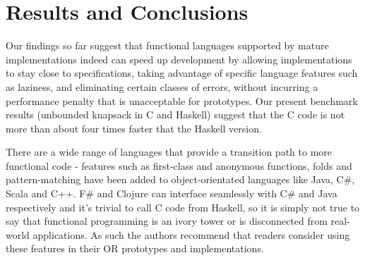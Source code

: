 \section{Results and Conclusions}

Our findings so far suggest that functional languages supported by mature
implementations indeed can speed up development by allowing implementations to
stay close to specifications, taking advantage of specific language features
such as laziness, and eliminating certain classes of errors, without incurring
a performance penalty that is unacceptable for prototypes. Our present
benchmark results (unbounded knapsack in C and Haskell) suggest that the C
code is not more than about four times faster that the Haskell version.

There are a wide range of languages that provide a transition path to more functional code - features such as first-class and anonymous functions, folds and pattern-matching have been added to object-orientated languages like Java, C\#, Scala and C++. F\# and Clojure can interface seamlessly with C\# and Java respectively and it's trivial to call C code from Haskell\cite{ffi}, so it is simply not true to say that functional programming is an ivory tower or is disconnected from real-world applications. As such the authors recommend that readers consider using these features in their OR prototypes and implementations.
